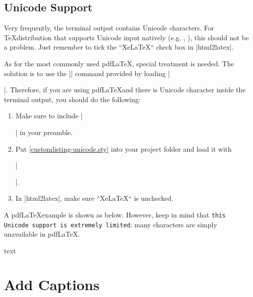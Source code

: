 \documentclass[letterpaper, 11pt, DIV=11]{scrartcl}
\begin{document}
\subsection{Unicode Support}

Very frequently, the terminal output contains Unicode characters. For \TeX distribution that supports Unicode input natively (e.g. \XeLaTeX, \LuaLaTeX), this should not be a problem. Just remember to tick the ``XeLaTeX`` check box in \rawinline|html2latex|.


As for the most commonly used pdf\LaTeX, special treatment is needed. The solution is to use the \texinline|\unichar| command provided by loading \texinline|\usepackage[utf8x]{inputenc}|. Therefore, if you are using pdf\LaTeX and there is Unicode character inside the terminal output, you should do the following:

\begin{enumerate}
\item Make sure to include \texinline|\usepackage[utf8x]{inputenc}| in your preamble.
\item Put \href{https://github.com/xziyue/latex-beautiful-listings-screenshot/blob/master/customlisting-unicode.sty}{\rawinline|customlisting-unicode.sty|} into your project folder and load it with 

\texinline|\usepackage{customlisting-unicode}|.
\item In \rawinline|html2latex|, make sure ``XeLaTeX`` is unchecked.
\end{enumerate}

A pdf\LaTeX example is shown as below. However, keep in mind that \texttt{this Unicode support is extremely limited}: many characters are simply unavailable in pdf\LaTeX.

\begin{tcbsrccode}{text}

\end{tcbsrccode}



\section{Add Captions}
\end{document}
